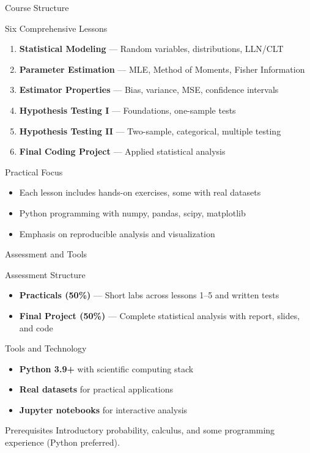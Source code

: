 \documentclass{beamer}
\begin{document}
\begin{frame}{Course Structure}
  \begin{block}{Six Comprehensive Lessons}
    \begin{enumerate}
      \item \textbf{Statistical Modeling} — Random variables, distributions, LLN/CLT
      \item \textbf{Parameter Estimation} — MLE, Method of Moments, Fisher Information
      \item \textbf{Estimator Properties} — Bias, variance, MSE, confidence intervals
      \item \textbf{Hypothesis Testing I} — Foundations, one-sample tests
      \item \textbf{Hypothesis Testing II} — Two-sample, categorical, multiple testing
      \item \textbf{Final Coding Project} — Applied statistical analysis
    \end{enumerate}
  \end{block}

  \begin{block}{Practical Focus}
    \begin{itemize}
      \item Each lesson includes hands-on exercises, some with real datasets
      \item Python programming with numpy, pandas, scipy, matplotlib
      \item Emphasis on reproducible analysis and visualization
    \end{itemize}
  \end{block}
\end{frame}

\begin{frame}{Assessment and Tools}
  \begin{block}{Assessment Structure}
    \begin{itemize}
      \item \textbf{Practicals (50\%)} — Short labs across lessons 1–5 and written tests
      \item \textbf{Final Project (50\%)} — Complete statistical analysis with report, slides, and code
    \end{itemize}
  \end{block}

  \begin{block}{Tools and Technology}
    \begin{itemize}
      \item \textbf{Python 3.9+} with scientific computing stack
      \item \textbf{Real datasets} for practical applications
      \item \textbf{Jupyter notebooks} for interactive analysis
    \end{itemize}
  \end{block}

  \begin{block}{Prerequisites}
    Introductory probability, calculus, and some programming experience (Python preferred).
  \end{block}
\end{frame}
\end{document}

